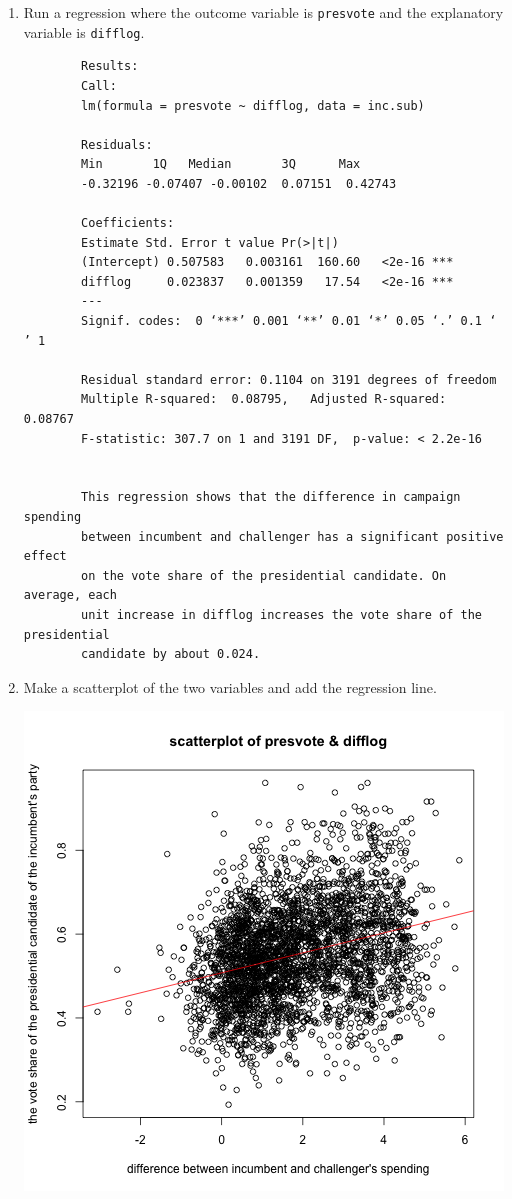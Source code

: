 \documentclass[12pt,letterpaper]{article}
\begin{document}
	\begin{enumerate}
		\item Run a regression where the outcome variable is \texttt{presvote} and the explanatory variable is \texttt{difflog}.
		
		  
		
		\begin{verbatim}
		Results: 
		Call:
		lm(formula = presvote ~ difflog, data = inc.sub)
		
		Residuals:
		Min       1Q   Median       3Q      Max 
		-0.32196 -0.07407 -0.00102  0.07151  0.42743 
		
		Coefficients:
		Estimate Std. Error t value Pr(>|t|)    
		(Intercept) 0.507583   0.003161  160.60   <2e-16 ***
		difflog     0.023837   0.001359   17.54   <2e-16 ***
		---
		Signif. codes:  0 ‘***’ 0.001 ‘**’ 0.01 ‘*’ 0.05 ‘.’ 0.1 ‘ ’ 1
		
		Residual standard error: 0.1104 on 3191 degrees of freedom
		Multiple R-squared:  0.08795,	Adjusted R-squared:  0.08767 
		F-statistic: 307.7 on 1 and 3191 DF,  p-value: < 2.2e-16
		
		
		This regression shows that the difference in campaign spending 
		between incumbent and challenger has a significant positive effect 
		on the vote share of the presidential candidate. On average, each 
		unit increase in difflog increases the vote share of the presidential 
		candidate by about 0.024.
		\end{verbatim}
		
		\item Make a scatterplot of the two variables and add the regression line. 
		
		  
		\includegraphics[width=.75\textwidth]{q2_regression.png}
		

\end{enumerate}
\end{document}
